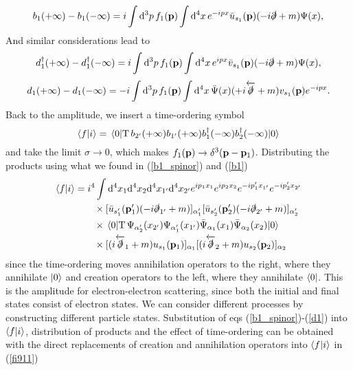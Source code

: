 \begin{equation}
    b_1(+\infty)-b_1(-\infty)=i\int\dd^3p\,f_1(\vb{p})\int\dd^4x\,e^{-ipx}\bar{u}_{s_1}(\vb{p})(-i\slashed{\partial}+m)\Psi(x),
    \label{b1}
\end{equation}
And similar considerations lead to
\begin{equation}
    d^\dagger_1(+\infty)-d^\dagger_1(-\infty)=i\int\dd^3p\,f_1(\vb{p})\int\dd^4x\,e^{ipx}\bar{v}_{s_1}(\vb{p})(-i\slashed{\partial}+m)\Psi(x),
    \label{d1dagger}
\end{equation}
\begin{equation}
     d_1(+\infty)-d_1(-\infty)=-i\int\dd^3 p\, f_1(\vb{p})\int \dd^4x\,\Bar{\Psi}(x)(+i\overleftarrow{\slashed{\partial}}+m)v_{s_1}(\vb{p})e^{-ipx}.
     \label{d1}
\end{equation}
Back to the amplitude, we insert a time-ordering symbol
\begin{equation}
    \braket{f}{i}=\vev{\text{T}\,b_{2^\prime}(+\infty)b_{1^\prime}(+\infty)b_1^\dagger(-\infty)b_2^\dagger(-\infty)}
    \label{fi911}
\end{equation}
and take the limit $\sigma\to0$, which makes $f_1(\vb{p})\to\delta^3(\vb{p}-\vb{p}_1)$. Distributing the products using what we found in (\ref{b1_spinor}) and (\ref{b1})
\begin{equation}
\begin{aligned}
\braket{f}{i}&=i^4\int\dd^4x_1\dd^4x_2\dd^4x_{1^\prime}\dd^4x_{2^\prime}e^{ip_1x_{1}}e^{ip_2x_{2}}e^{-ip^\prime_1x_{1^\prime}}e^{-ip^\prime_2x_{2^\prime}}\\
&\qquad\times[\bar{u}_{s_1^\prime}(\vb{p}_1^\prime)(-i\slashed{\partial}_{{1^\prime}}+m)]_{\alpha_1^\prime}[\bar{u}_{s_2^\prime}(\vb{p}_2^\prime)(-i\slashed{\partial}_{{2^\prime}}+m)]_{\alpha_2^\prime}\\
&\qquad\times\vev{\text{T}\,\Psi_{\alpha^\prime_2}(x_{2^\prime})\Psi_{\alpha^\prime_1}(x_{1^\prime})\bar{\Psi}_{\alpha_1}(x_1)\bar{\Psi}_{\alpha_2}(x_2)}
\\&\qquad\times[(i\overleftarrow{\slashed{\partial}}_{1}+m)u_{s_1}(\vb{p}_1)]_{\alpha_1}[(i\overleftarrow{\slashed{\partial}}_{2}+m)u_{s_2}(\vb{p}_2)]_{\alpha_2}
\end{aligned}
\end{equation}
since the time-ordering moves annihilation operators to the right, where they annihilate $\ket{0}$ and creation operators to the left, where they annihilate $\bra{0}$.
This is the amplitude for electron-electron scattering, since both the initial and final states consist of electron states. We can consider different processes by constructing different particle states. Substitution of eqs (\ref{b1_spinor})-(\ref{d1}) into $\braket{f}{i}$, distribution of products and the effect of time-ordering can be obtained with the direct replacements of creation and annihilation operators into $\braket{f}{i}$ in (\ref{fi911})
